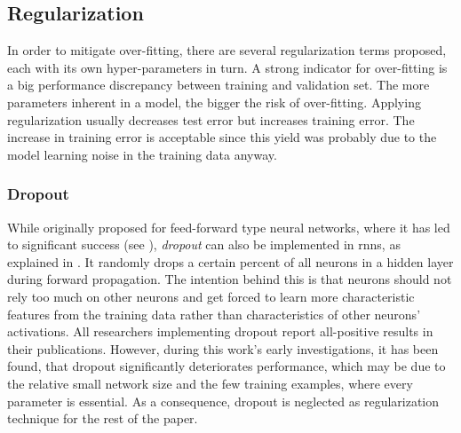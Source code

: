 \subsection{Regularization}
\label{ssec:reg}
In order to mitigate over-fitting, there are several regularization terms proposed, each with its own hyper-parameters in turn.
A strong indicator for over-fitting is a big performance discrepancy between training and validation set.
The more parameters inherent in a model, the bigger the risk of over-fitting. 
Applying regularization usually decreases test error but increases training error.
The increase in training error is acceptable since this yield was probably due to the model learning noise in the training data anyway.

\subsubsection{Dropout}
While originally proposed for feed-forward type neural networks, where it has led to significant success (see \cite{KriSu2012}), \textit{dropout} can also be implemented in \glspl{rnn}, as explained in \cite{ZaSu2014}.
It randomly drops a certain percent of all neurons in a hidden layer during forward propagation.
The intention behind this is that neurons should not rely too much on other neurons and get forced to learn more characteristic features from the training data rather than characteristics of other neurons' activations.
All researchers implementing dropout report all-positive results in their publications.
However, during this work's early investigations, it has been found, that dropout significantly deteriorates performance, which may be due to the relative small network size and the few training examples, where every parameter is essential.
As a consequence, dropout is neglected as regularization technique for the rest of the paper.


